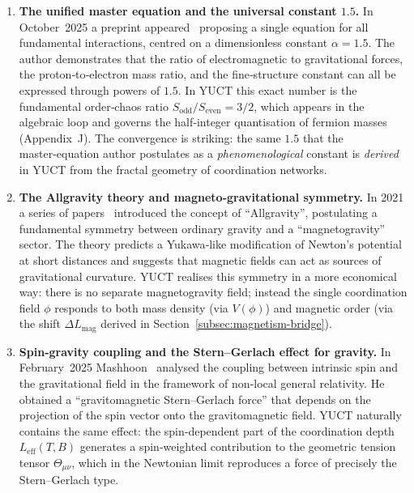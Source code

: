 \documentclass[12pt]{article}
\theoremstyle{remark}
\begin{document}
	\begin{enumerate}
		
		\item \textbf{The unified master equation and the universal constant $1.5$.}
		In October~2025 a preprint appeared~\cite{UnifiedMaster2025} proposing a single
		equation for all fundamental interactions, centred on a dimensionless constant
		$\alpha = 1.5$.  The author demonstrates that the ratio of electromagnetic to
		gravitational forces, the proton‑to‑electron mass ratio, and the fine‑structure
		constant can all be expressed through powers of $1.5$.
		In YUCT this exact number is the fundamental order‑chaos ratio
		$S_{\mathrm{odd}}/S_{\mathrm{even}} = 3/2$, which appears in the algebraic loop
		and governs the half‑integer quantisation of fermion masses (Appendix~J).
		The convergence is striking: the same $1.5$ that the master‑equation author
		postulates as a \emph{phenomenological} constant is \emph{derived} in YUCT from
		the fractal geometry of coordination networks.
		
		\item \textbf{The Allgravity theory and magneto‑gravitational symmetry.}
		In 2021 a series of papers~\cite{Allgravity2021} introduced the concept of
		``Allgravity'', postulating a fundamental symmetry between ordinary gravity and
		a ``magnetogravity'' sector.  The theory predicts a Yukawa‑like modification
		of Newton's potential at short distances and suggests that magnetic fields
		can act as sources of gravitational curvature.
		YUCT realises this symmetry in a more economical way: there is no separate
		magnetogravity field; instead the single coordination field $\phi$ responds
		to both mass density (via $V(\phi)$) and magnetic order (via the shift
		$\Delta L_{\mathrm{mag}}$ derived in Section~\ref{subsec:magnetism-bridge}).
		
		\item \textbf{Spin‑gravity coupling and the Stern–Gerlach effect for gravity.}
		In February~2025 Mashhoon~\cite{Mashhoon2025} analysed the coupling between
		intrinsic spin and the gravitational field in the framework of non‑local
		general relativity.  He obtained a ``gravitomagnetic Stern–Gerlach force''
		that depends on the projection of the spin vector onto the gravitomagnetic
		field.  YUCT naturally contains the same effect: the spin‑dependent part
		of the coordination depth $L_{\mathrm{eff}}(T,B)$ generates a spin‑weighted
		contribution to the geometric tension tensor $\Theta_{\mu\nu}$, which in the
		Newtonian limit reproduces a force of precisely the Stern–Gerlach type.
		

\end{enumerate}
\end{document}
